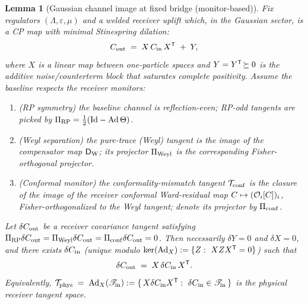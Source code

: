 \documentclass[10pt]{article}
\theoremstyle{definition}
\theoremstyle{plain}
\newtheorem{lemma}{Lemma}[section]
\begin{document}
\begin{lemma}[Gaussian channel image at fixed bridge (monitor-based)]
\label{lem:gauss-image-monitor}
Fix regulators $(\Lambda,\varepsilon,\mu)$ and a welded receiver uplift which, in the Gaussian sector,
is a CP map with \emph{minimal} Stinespring dilation:
\[
C_{\rm out}\;=\;X\,C_{\rm in}\,X^{\sf T}\;+\;Y,
\]
where $X$ is a linear map between one-particle spaces and $Y=Y^{\sf T}\!\succeq 0$ is the additive
noise/counterterm block that saturates complete positivity. Assume the baseline respects the receiver
monitors:
\begin{enumerate}[label=(M\arabic*),leftmargin=1.8em]
\item (\emph{RP symmetry}) the baseline channel is reflection-even; RP-odd tangents are picked by
$\Pi_{\rm RP}=\tfrac12(\mathrm{Id}-\mathrm{Ad}\,\Theta)$.
\item (\emph{Weyl separation}) the pure-trace (Weyl) tangent is the image of the compensator map
$\mathsf D_{\rm W}$; its projector $\Pi_{\rm Weyl}$ is the corresponding Fisher-orthogonal projector.
\item (\emph{Conformal monitor}) the conformality-mismatch tangent $\mathcal T_{\rm conf}$ is the closure of the
image of the receiver \emph{conformal Ward-residual} map $C\mapsto({\cal O}_i[C])_i$, Fisher-orthogonalized
to the Weyl tangent; denote its projector by $\Pi_{\rm conf}$.
\end{enumerate}
Let $\delta C_{\rm out}$ be a receiver covariance tangent satisfying
$\Pi_{\rm RP}\delta C_{\rm out}=\Pi_{\rm Weyl}\delta C_{\rm out}=\Pi_{\rm conf}\delta C_{\rm out}=0$.
Then necessarily $\delta Y=0$ and $\delta X=0$, and there exists $\delta C_{\rm in}$ (unique modulo
$\ker(\mathrm{Ad}_X):=\{Z:\ X Z X^{\sf T}=0\}$) such that
\[
\delta C_{\rm out}\;=\;X\,\delta C_{\rm in}\,X^{\sf T}.
\]
Equivalently,
\(
\mathcal T_{\rm phys}\;=\;\mathrm{Ad}_X(\mathscr T_{\rm in})
:=\{\,X\delta C_{\rm in}X^{\sf T}:\ \delta C_{\rm in}\in\mathscr T_{\rm in}\,\}
\)
is the physical receiver tangent space.
\end{lemma}
\end{document}
